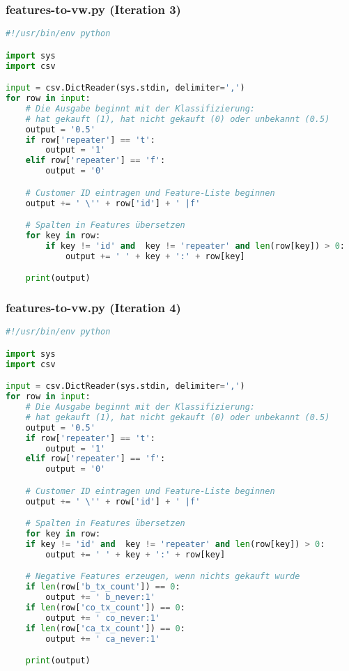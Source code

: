 \subsubsection{features-to-vw.py (Iteration 3)}
\label{code:features-to-vw}
\begin{lstlisting}[language=Python]
#!/usr/bin/env python

import sys
import csv

input = csv.DictReader(sys.stdin, delimiter=',')
for row in input:
	# Die Ausgabe beginnt mit der Klassifizierung:
	# hat gekauft (1), hat nicht gekauft (0) oder unbekannt (0.5)
	output = '0.5'
	if row['repeater'] == 't':
		output = '1'
	elif row['repeater'] == 'f':
		output = '0'

	# Customer ID eintragen und Feature-Liste beginnen
	output += ' \'' + row['id'] + ' |f'

	# Spalten in Features übersetzen
	for key in row:
		if key != 'id' and  key != 'repeater' and len(row[key]) > 0:
			output += ' ' + key + ':' + row[key]

	print(output)
\end{lstlisting}

\subsubsection{features-to-vw.py (Iteration 4)}
\label{code:features-to-vw-4}
\begin{lstlisting}[language=Python]
#!/usr/bin/env python

import sys
import csv

input = csv.DictReader(sys.stdin, delimiter=',')
for row in input:
    # Die Ausgabe beginnt mit der Klassifizierung:
    # hat gekauft (1), hat nicht gekauft (0) oder unbekannt (0.5)
    output = '0.5'
    if row['repeater'] == 't':
        output = '1'
    elif row['repeater'] == 'f':
        output = '0'

    # Customer ID eintragen und Feature-Liste beginnen
    output += ' \'' + row['id'] + ' |f'

    # Spalten in Features übersetzen
    for key in row:
    if key != 'id' and  key != 'repeater' and len(row[key]) > 0:
        output += ' ' + key + ':' + row[key]

    # Negative Features erzeugen, wenn nichts gekauft wurde
    if len(row['b_tx_count']) == 0:
        output += ' b_never:1'
    if len(row['co_tx_count']) == 0:
        output += ' co_never:1'
    if len(row['ca_tx_count']) == 0:
        output += ' ca_never:1'

    print(output)
\end{lstlisting}


